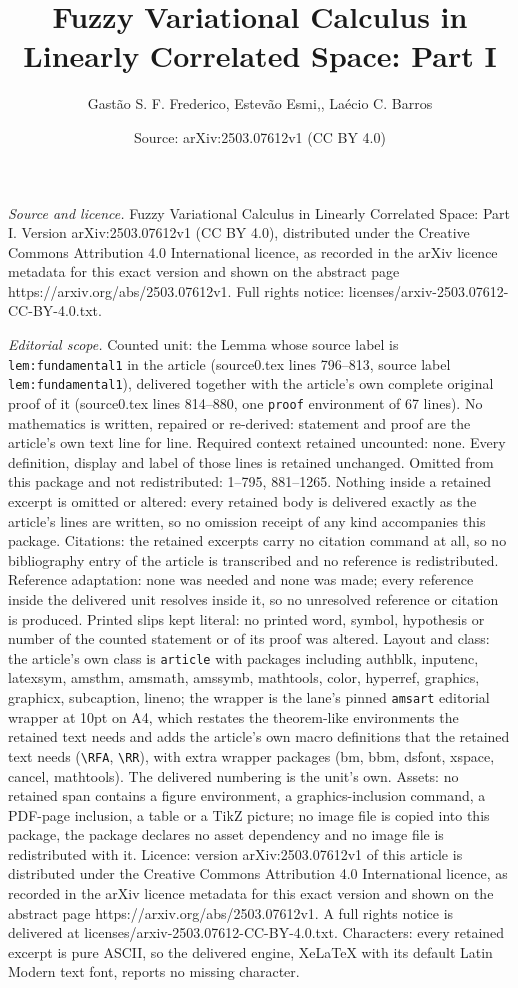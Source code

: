 \documentclass[10pt,a4paper]{amsart}
\title[Fuzzy Variational Calculus in Linearly Correlated Space: Par]{Fuzzy Variational Calculus in Linearly Correlated Space: Part I}
\author{Gast\~ao S. F. Frederico, Estev\~ao Esmi,, La\'ecio C. Barros}
\date{Source: arXiv:2503.07612v1 (CC BY 4.0)}
\begin{document}
\maketitle

\noindent\emph{Source and licence.} Fuzzy Variational Calculus in Linearly Correlated Space: Part I. Version arXiv:2503.07612v1 (CC BY 4.0), distributed under the Creative Commons Attribution 4.0 International licence, as recorded in the arXiv licence metadata for this exact version and shown on the abstract page https://arxiv.org/abs/2503.07612v1. Full rights notice: licenses/arxiv-2503.07612-CC-BY-4.0.txt.\par\smallskip

\noindent\textit{Editorial scope.} Counted unit: the Lemma whose source label is \texttt{lem:fundamental1} in the article (source0.tex lines 796--813, source label \texttt{lem:fundamental1}), delivered together with the article's own complete original proof of it (source0.tex lines 814--880, one \texttt{proof} environment of 67 lines). No mathematics is written, repaired or re-derived: statement and proof are the article's own text line for line. Required context retained uncounted: none. Every definition, display and label of those lines is retained unchanged. Omitted from this package and not redistributed: 1--795, 881--1265. Nothing inside a retained excerpt is omitted or altered: every retained body is delivered exactly as the article's lines are written, so no omission receipt of any kind accompanies this package. Citations: the retained excerpts carry no citation command at all, so no bibliography entry of the article is transcribed and no reference is redistributed. Reference adaptation: none was needed and none was made; every reference inside the delivered unit resolves inside it, so no unresolved reference or citation is produced. Printed slips kept literal: no printed word, symbol, hypothesis or number of the counted statement or of its proof was altered. Layout and class: the article's own class is \texttt{article} with packages including authblk, inputenc, latexsym, amsthm, amsmath, amssymb, mathtools, color, hyperref, graphics, graphicx, subcaption, lineno; the wrapper is the lane's pinned \texttt{amsart} editorial wrapper at 10pt on A4, which restates the theorem-like environments the retained text needs and adds the article's own macro definitions that the retained text needs (\texttt{\textbackslash RFA}, \texttt{\textbackslash RR}), with extra wrapper packages (bm, bbm, dsfont, xspace, cancel, mathtools). The delivered numbering is the unit's own. Assets: no retained span contains a figure environment, a graphics-inclusion command, a PDF-page inclusion, a table or a TikZ picture; no image file is copied into this package, the package declares no asset dependency and no image file is redistributed with it. Licence: version arXiv:2503.07612v1 of this article is distributed under the Creative Commons Attribution 4.0 International licence, as recorded in the arXiv licence metadata for this exact version and shown on the abstract page https://arxiv.org/abs/2503.07612v1. A full rights notice is delivered at licenses/arxiv-2503.07612-CC-BY-4.0.txt. Characters: every retained excerpt is pure ASCII, so the delivered engine, XeLaTeX with its default Latin Modern text font, reports no missing character.
\end{document}
